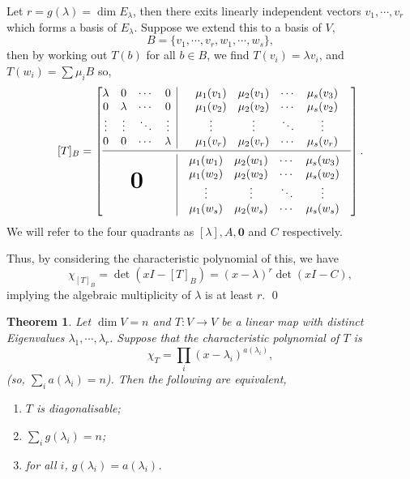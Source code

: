 \documentclass[
]{article}
\newtheorem{theorem}{Theorem}
\theoremstyle{definition}
\begin{document}
Let \(r = g(\lambda) = \dim E_{\lambda}\), then there exits linearly
independent vectors \(v_1, \cdots, v_r\) which forms a basis of
\(E_{\lambda}\). Suppose we extend this to a basis of \(V\),
\[B = \{v_1, \cdots, v_r, w_1, \cdots, w_s\},\] then by working out
\(T(b)\) for all \(b \in B\), we find \(T(v_i) = \lambda v_i\), and
\(T(w_i) = \sum \mu_i B\) so, \[ [T]_B =
  \left[
    \begin{array}{@{}c|c@{}}
      \begin{matrix}
        \lambda & 0 & \cdots & 0 \\
        0 & \lambda & \cdots & 0 \\
        \vdots & \vdots & \ddots & \vdots \\
        0 & 0 & \cdots & \lambda \\
      \end{matrix}
          & 
      \begin{matrix}
        \mu_1(v_1) & \mu_2(v_1) & \cdots & \mu_s(v_3) \\
        \mu_1(v_2) & \mu_2(v_2) & \cdots & \mu_s(v_2) \\
        \vdots & \vdots & \ddots & \vdots\\
        \mu_1(v_r) & \mu_2(v_r) & \cdots & \mu_s(v_r)\\
      \end{matrix} \\
      \cmidrule[0.4pt]{1-2}
      \textbf{\text{\huge0}} & \hspace{2mm}
      \begin{matrix}
        \mu_1(w_1) & \mu_2(w_1) & \cdots & \mu_s(w_3)\\
        \mu_1(w_2) & \mu_2(w_2) & \cdots & \mu_s(w_2)\\
        \vdots & \vdots & \ddots & \vdots &\\
        \mu_1(w_s) & \mu_2(w_s) & \cdots & \mu_s(w_s)\\
      \end{matrix} \\
    \end{array} 
  \right]. \] We will refer to the four quadrants as
\([\lambda], A, \mathbf{0}\) and \(C\) respectively.

Thus, by considering the characteristic polynomial of this, we have
\[\chi_{[T]_B} = \det(xI - [T]_B) =  (x - \lambda)^r \det(xI - C),\]
implying the algebraic multiplicity of \(\lambda\) is at least \(r\).
\qed

\begin{theorem}
  Let \(\dim V = n\) and \(T : V \to V\) be a linear map with distinct 
  Eigenvalues \(\lambda_1, \cdots, \lambda_r\). Suppose that the characteristic 
  polynomial of \(T\) is 
  \[\chi_T = \prod_i (x - \lambda_i)^{a(\lambda_i)},\]
  (so, \(\sum_i a(\lambda_i) = n\)). Then the following are equivalent,
  \begin{enumerate}
    \item \(T\) is diagonalisable;
    \item \(\sum_i g(\lambda_i) = n\);
    \item for all \(i\), \(g(\lambda_i) = a(\lambda_i)\).
  \end{enumerate}
\end{theorem}
\proof
\end{document}
